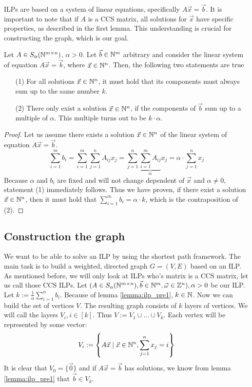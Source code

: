 ILPs are based on a system of linear equations, specifically $A \vec{x} = \vec{b}$. It is important to note that if $A$ is a CCS matrix, all solutions for $\vec{x}$ have specific properties, as described in the first lemma. This understanding is crucial for constructing the graph, which is our goal.

\begin{lemma}
    \label{lemma:ilp_pre1}
    Let $A\in S_\alpha(\mathbb{N}^{m \times n})$, $\alpha > 0$. Let $\vec b \in \mathbb{N}^m$ arbitrary and consider the linear system of equation $A\vec x=\vec b$, where $\vec x \in \mathbb{N}^n$. Then, the following two statements are true

    \begin{enumerate}
        \item[(1)] For all solutions $\vec x \in \mathbb{N}^n$, it must hold that its components must always sum up to the same number $k$.
        \item[(2)] There only exist a solution $\vec x \in \mathbb{N}^n$, if the components of $\vec b$ sum up to a multiple of $\alpha$. This multiple turns out to be $k \cdot \alpha$.
    \end{enumerate}
\end{lemma}

\begin{proof}
    Let us assume there exists a solution $\vec x \in \mathbb{N}^n$ of the linear system of equation $A\vec x=\vec b$.
    $$\sum_{i=1}^m b_i = \sum_{i=1}^{m}\sum_{j=1}^{n}A_{ij} x_j = \sum_{j=1}^{n}\underbrace{\sum_{i=1}^{m}A_{ij}}_\alpha x_j = \alpha \cdot \sum_{j=1}^{n}x_j$$
    Because $\alpha$ and $b_i$ are fixed and will not change dependent of $\vec x$ and $\alpha \neq 0$, statement (1) immediately follows. Thus we have proven, if there exist a solution $\vec x \in \mathbb{N}^n$, then it must hold that $\sum_{i=1}^{m}b_i = \alpha \cdot k$, which is the contraposition of (2).
\end{proof}


\subsection{Construction the graph}
\label{chap:graph_constrition}
We want to be able to solve an ILP by using the shortest path framework. The main task is to build a weighted, directed graph $G = (V, E)$ based on an ILP. As mentioned before, we will only look at ILPs who's matrix is a CCS matrix, let us call those CCS ILPs. Let $(A \in S_\alpha(\mathbb{N}^{m \times n}), \vec b \in \mathbb{N}^m, \vec\omega \in \mathbb{Z}^n), \alpha > 0$ be our ILP. Let $k := \frac{1}{\alpha} \sum_{i=1}^{n}b_i$. Because of lemma \ref{lemma:ilp_pre1}, $k \in \mathbb{N}$. Now we can build the set of vertices $V$. The resulting graph consists of $k$ layers of vertices. We will call the layers $V_i, i \in [k]$. Thus $V := V_1 \cup \dots \cup V_k$. Each vertex will be represented by some vector:
$$V_i := \left\{A\vec x \mid \vec x \in \mathbb{N}^n, \sum_{j=1}^{n} x_j = i \right\}$$ 
It is clear that $V_0 = \{\vec 0\}$ and if $A\vec x = \vec b$ has solutions, we know from lemma \ref{lemma:ilp_pre1} that $\vec b \in V_k$. 

